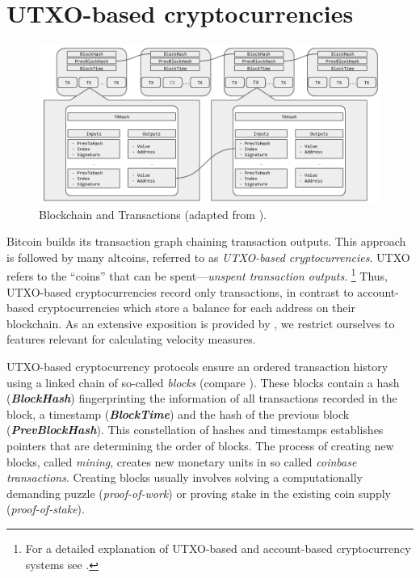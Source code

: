 \section{UTXO-based cryptocurrencies}
\label{sec:concept_utxo}%


\begin{figure}
  \centerline{%
    \ifdefined\varInputFigs%
    \includegraphics[width=0.8\linewidth]{fig/utxo_sys}%
    \else%
    \fi%
  }%
  \caption{Blockchain and Transactions (adapted from \cite{tschorsch2016bitcoin}).}
  \label{fig:utxo_sys}
\end{figure}


Bitcoin builds its transaction graph chaining transaction outputs. %
This approach is followed by many altcoins, referred to as %
\emph{UTXO-based cryptocurrencies}. %
UTXO refers to the ``coins'' that can be spent---\emph{unspent transaction
  outputs}.%
\footnote{For a detailed explanation of UTXO-based and account-based %
  cryptocurrency systems see \cite{zahnentferner2018chimeric}.} %
Thus, UTXO-based cryptocurrencies record only transactions, in contrast to
account-based cryptocurrencies which store a balance for each address on
their blockchain. %
As an extensive exposition is provided by \cite{tschorsch2016bitcoin}, we
restrict ourselves to features relevant for calculating velocity measures. %

UTXO-based cryptocurrency protocols ensure an ordered transaction history
using a linked chain of so-called \textit{blocks} (compare
). %
These blocks contain a hash ({\ttfamily\bfseries\slshape BlockHash})
fingerprinting the information of all transactions recorded in the block, a
timestamp ({\ttfamily\bfseries\slshape BlockTime}) and the hash of the
previous block ({\ttfamily\bfseries\slshape PrevBlockHash}). %
This constellation of hashes and timestamps establishes pointers that are
determining the order of blocks. %
The process of creating new blocks, called \emph{mining}, creates new
monetary units in so called \emph{coinbase transactions}. %
Creating blocks usually involves solving a computationally demanding puzzle
(\emph{proof-of-work}) or proving stake in the existing coin supply
(\emph{proof-of-stake}). %

